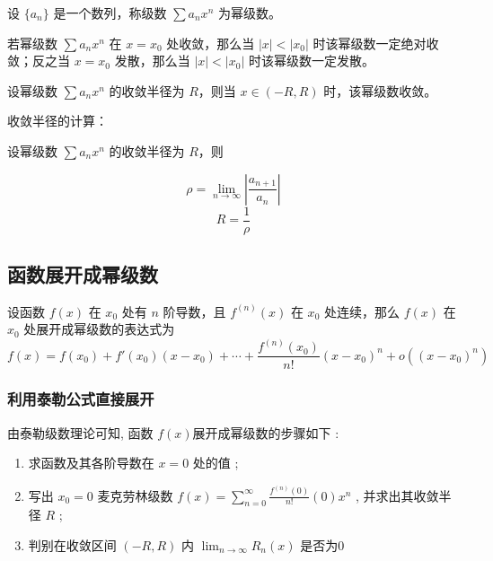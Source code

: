 \begin{definition}
    设 $\{a_{n}\}$ 是一个数列，称级数 $\sum a_{n} x^{n}$ 为幂级数。
\end{definition}

\begin{theorem}[阿贝尔定理]
    若幂级数 $\sum a_{n} x^{n}$ 在 $x = x_{0}$ 处收敛，那么当 $|x|<|x_0|$ 时该幂级数一定绝对收敛；反之当 $x=x_0$ 发散，那么当 $|x|<|x_0|$ 时该幂级数一定发散。
\end{theorem}

\begin{definition}[收敛半径]
    设幂级数 $\sum a_{n} x^{n}$ 的收敛半径为 $R$，则当 $x \in (-R,R)$ 时，该幂级数收敛。
\end{definition}

收敛半径的计算：

设幂级数 $\sum a_{n} x^{n}$ 的收敛半径为 $R$，则

\[\rho = \lim\limits_{n \to \infty} \left| \frac{a_{n+1}}{a_{n}} \right| \]
\[R = \frac{1}{\rho}\]

\subsection{函数展开成幂级数}

\begin{theorem}
    设函数 $f(x)$ 在 $x_{0}$ 处有 $n$ 阶导数，且 $f^{(n)}(x)$ 在 $x_{0}$ 处连续，那么 $f(x)$ 在 $x_{0}$ 处展开成幂级数的表达式为
    \[f(x) = f(x_{0}) + f'(x_{0})(x-x_{0}) + \cdots + \frac{f^{(n)}(x_{0})}{n!}(x-x_{0})^{n} + o((x-x_{0})^{n})\]
\end{theorem}

\subsubsection{利用泰勒公式直接展开}

由泰勒级数理论可知, 函数 $f(x)$展开成幂级数的步骤如下 :
\begin{enumerate}
    \item 求函数及其各阶导数在 $x = 0$ 处的值 ;
    \item 写出 $x_0=0$ 麦克劳林级数 $f(x)=\sum\limits_{n=0}^{\infty}\frac{f^{(n)}(0)}{n!}(0)x^n$ , 并求出其收敛半径 $R$ ;
    \item 判别在收敛区间 $(-R,R)$ 内 $\lim_{n \to \infty} R_n(x)$ 是否为$0$
\end{enumerate}

